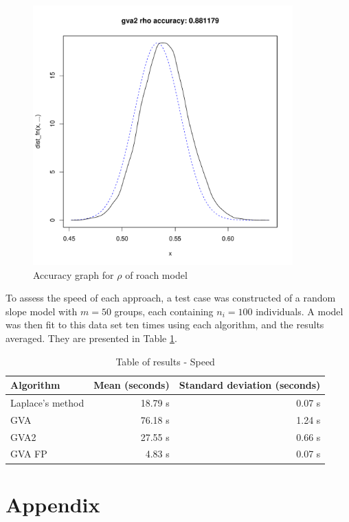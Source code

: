 \documentclass{article}[12pt]
\begin{document}
\begin{figure}
\caption{Accuracy graph for $\rho$ of roach model}
\label{fig:accuracy_roach_rho}
\includegraphics[width=100mm, height=100mm]{code/results/17_accuracy_plots_application_gva2.pdf}
\end{figure}

To assess the speed of each approach, a test case was constructed of a random slope model with $m=50$ groups, 
each containing $n_i = 100$ individuals. A model was then fit to this data set ten times using each algorithm,
and the results averaged. They are presented in Table \ref{tab:application_slope_speed}.

\begin{table}
\caption{Table of results - Speed}
\label{tab:application_slope_speed}
\begin{tabular}{|l|rr|}
\hline
Algorithm & Mean (seconds) & Standard deviation (seconds) \\
\hline
Laplace's method & 18.79 s & 0.07 s \\
GVA & 76.18 s & 1.24 s \\
GVA2 & 27.55 s & 0.66 s \\
GVA FP & 4.83 s & 0.07 s \\
\hline
\end{tabular}
\end{table}


\newpage
\section{Appendix} 
\end{document}
